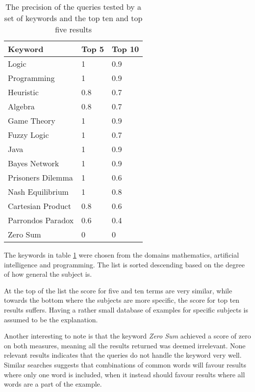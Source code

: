 \begin{table}[h!]
\centering
\begin{tabular} {|| p{15em} | p{5em} | p{5em} ||} 
 \hline
 Keyword & Top 5 & Top 10 \\ [0.5ex] 
 \hline

Logic & 1 & 0.9 \\
Programming & 1 & 0.9 \\
Heuristic & 0.8 & 0.7 \\
Algebra & 0.8 & 0.7 \\
Game Theory & 1 & 0.9 \\

Fuzzy Logic & 1 & 0.7 \\
Java & 1 & 0.9 \\
Bayes Network & 1 & 0.9 \\

Prisoners Dilemma & 1 & 0.6 \\
Nash Equilibrium & 1 & 0.8 \\
Cartesian Product & 0.8 & 0.6 \\
Parrondos Paradox & 0.6 & 0.4 \\
Zero Sum & 0 & 0 \\

 \hline
\end{tabular}
\caption{The precision of the queries tested by a set of keywords and the top ten and top five results}
\label{table:precision_test}
\end{table}

The keywords in table \ref{table:precision_test} were chosen from the domains mathematics, artificial intelligence and programming. The list is sorted descending based on the degree of how general the subject is.

At the top of the list the score for five and ten terms are very similar, while towards the bottom where the subjects are more specific, the score for top ten results suffers. Having a rather small database of examples for specific subjects is assumed to be the explanation.

Another interesting to note is that the keyword \textit{Zero Sum} achieved a score of zero on both measures, meaning all the results returned was deemed irrelevant. None relevant results indicates that the queries do not handle the keyword very well. Similar searches suggests that combinations of common words will favour results where only one word is included, when it instead should favour results where all words are a part of the example.


\cleardoublepage